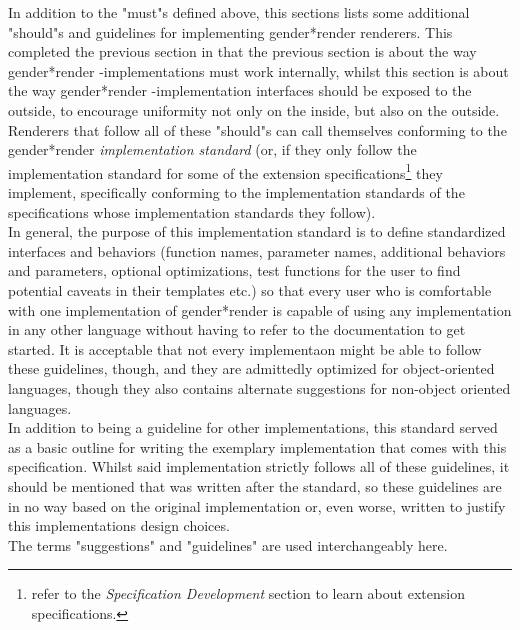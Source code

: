 \documentclass{article}
\newcommand{\GenderRender}{
    gender*render
}
\newcounter{subsubsubsection}[subsubsection]
\begin{document}
    In addition  to the "must"s defined above, this sections lists some additional "should"s and guidelines for implementing \GenderRender renderers.
    This completed the previous section in that the previous section is about the way \GenderRender-implementations must work internally, whilst this section is about the way \GenderRender-implementation interfaces should be exposed to the outside, to encourage uniformity not only on the inside, but also on the outside.\\
    Renderers that follow all of these "should"s can call themselves conforming to the \GenderRender \emph{implementation standard} (or, if they only follow the implementation standard for some of the extension specifications\footnote{refer to the \emph{Specification Development} section to learn about extension specifications.} they implement, specifically conforming to the implementation standards of the specifications whose implementation standards they follow).\\

    In general, the purpose of this implementation standard is to define standardized interfaces and behaviors (function names, parameter names, additional behaviors and parameters, optional optimizations, test functions for the user to find potential caveats in their templates etc.) so that every user who is comfortable with one implementation of \GenderRender is capable of using any implementation in any other language without having to refer to the documentation to get started.
    It is acceptable that not every implementaon might be able to follow these guidelines, though, and they are admittedly optimized for object-oriented languages, though they also contains alternate suggestions for non-object oriented languages.\\

    In addition to being a guideline for other implementations, this standard served as a basic outline for writing the exemplary implementation that comes with this specification.
    Whilst said implementation strictly follows all of these guidelines, it should be mentioned that was written after the standard, so these guidelines are in no way based on the original implementation or, even worse, written to justify this implementations design choices.\\

    The terms "suggestions" and "guidelines" are used interchangeably here.

\end{document}
